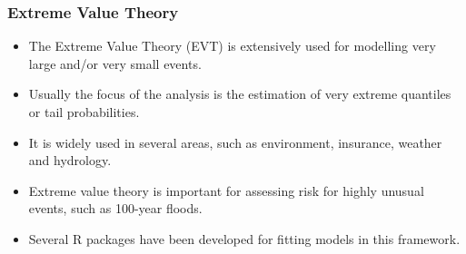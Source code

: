 \documentclass[MAIN.tex]{subfiles}
\begin{document}
 

\begin{frame}
	\frametitle{Extreme Value Theory}
	\begin{itemize}
		\item The Extreme Value Theory (EVT) is extensively used for modelling very large and/or very small events. 
		\item Usually the focus of the analysis is the estimation of very extreme quantiles or tail probabilities. 
		\item It is widely used in several areas, such as environment, insurance, weather and hydrology. 
		\item Extreme value theory is important for assessing risk for highly unusual events, such as 100-year floods.
		\item Several R packages have been developed for fitting models in this framework. 
	\end{itemize}
\end{frame}
\end{document}
